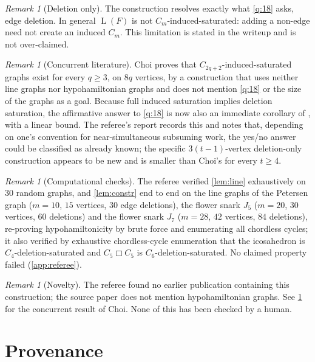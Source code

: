\documentclass[11pt,a4paper]{article}
\theoremstyle{plain}
\theoremstyle{definition}
\theoremstyle{remark}
\newtheorem{remark}[theorem]{Remark}
\newcommand{\Ln}{\operatorname{L}}
\newcommand{\cart}{\mathbin{\mdlgwhtsquare}}
\begin{document}
\begin{remark}[Deletion only]
The construction resolves exactly what \cref{q:18} asks, edge deletion. In general $\Ln(F)$ is not $C_m$-induced-saturated: adding a non-edge need not create an induced $C_m$. This limitation is stated in the writeup and is not over-claimed.
\end{remark}

\begin{remark}[Concurrent literature]\label{rem:choi}
Choi \cite{Choi26} proves that $C_{2q+2}$-induced-saturated graphs exist for every $q\ge3$, on $8q$ vertices, by a construction that uses neither line graphs nor hypohamiltonian graphs and does not mention \cref{q:18} or the size of the graphs as a goal. Because full induced saturation implies deletion saturation, the affirmative answer to \cref{q:18} is now also an immediate corollary of \cite{Choi26}, with a linear bound. The referee's report records this and notes that, depending on one's convention for near-simultaneous subsuming work, the yes/no answer could be classified as already known; the specific $3(t-1)$-vertex deletion-only construction appears to be new and is smaller than Choi's for every $t\ge4$.
\end{remark}

\begin{remark}[Computational checks]
The referee verified \cref{lem:line} exhaustively on $30$ random graphs, and \cref{lem:constr} end to end on the line graphs of the Petersen graph ($m=10$, $15$ vertices, $30$ edge deletions), the flower snark $J_5$ ($m=20$, $30$ vertices, $60$ deletions) and the flower snark $J_7$ ($m=28$, $42$ vertices, $84$ deletions), re-proving hypohamiltonicity by brute force and enumerating all chordless cycles; it also verified by exhaustive chordless-cycle enumeration that the icosahedron is $C_4$-deletion-saturated and $C_5\cart C_5$ is $C_6$-deletion-saturated. No claimed property failed (\cref{app:referee}).
\end{remark}

\begin{remark}[Novelty]
The referee found no earlier publication containing this construction; the source paper \cite{FHHS25} does not mention hypohamiltonian graphs. See \cref{rem:choi} for the concurrent result of Choi. None of this has been checked by a human.
\end{remark}

\section{Provenance}\label{sec:provenance}
\end{document}
